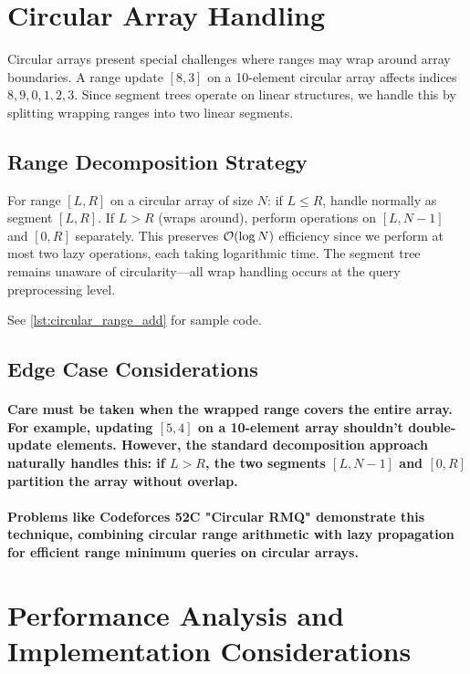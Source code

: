 \section{Circular Array Handling}
\label{sec:circular_updates}
Circular arrays present special challenges where ranges may wrap around array boundaries. A range update $[8,3]$ on a 10-element circular array affects indices $8,9,0,1,2,3$. Since segment trees operate on linear structures, we handle this by splitting wrapping ranges into two linear segments.
\subsection{Range Decomposition Strategy}
For range $[L,R]$ on a circular array of size $N$: if $L \leq R$, handle normally as segment $[L,R]$. If $L > R$ (wraps around), perform operations on $[L,N-1]$ and $[0,R]$ separately.
This preserves $\mathcal{O}(\log N)$ efficiency since we perform at most two lazy operations, each taking logarithmic time. The segment tree remains unaware of circularity—all wrap handling occurs at the query preprocessing level.
\begin{marginnoteenv}
    See \ref{lst:circular_range_add} for sample code.
\end{marginnoteenv}

\subsection{Edge Case Considerations}
\paragraph{Care must be taken when the wrapped range covers the entire array. For example, updating $[5,4]$ on a 10-element array shouldn't double-update elements. However, the standard decomposition approach naturally handles this: if $L > R$, the two segments $[L,N-1]$ and $[0,R]$ partition the array without overlap.}
\paragraph{Problems like Codeforces 52C "Circular RMQ" demonstrate this technique, combining circular range arithmetic with lazy propagation for efficient range minimum queries on circular arrays.}
\section{Performance Analysis and Implementation Considerations}
\label{sec:complexity_memory}
